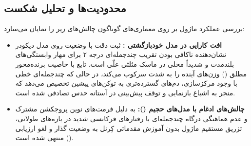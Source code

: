 \subsection{محدودیت‌ها و تحلیل شکست}
بررسی عملکرد ماژول بر روی معماری‌های گوناگون چالش‌های زیر را نمایان می‌سازد:
\begin{itemize}
    \item \textbf{افت کارایی در مدل خودبازگشتی :} ثبت دقت  با وضعیت  روی مدل دیکودر  نشان‌دهنده ناکافی بودن تقریب چندجمله‌ای درجه ۲ برای مهار وابستگی‌های بلندمدت و شدیداً محلی در ماسک مثلثی علّی است. تابع  با خاصیت برنده‌محور مطلق () وزن‌های آینده را به شدت سرکوب می‌کند، در حالی که چندجمله‌ای خطی با وجود مرکزسازی، دم‌های گسترده‌تری به توکن‌های پیشین تخصیص می‌دهد که منجر به اشباع بازنمایی و توقف پیش‌بینی در آستانه حدس تصادفی شده است.
    \item \textbf{چالش‌های ادغام با مدل‌های حجیم ():} به دلیل فرمت‌های نوین پروجکشن مشترک و عدم هماهنگی درگاه چندجمله‌ای با رفتارهای فرکانسی شدید  در بازه‌های طولانی، تزریق مستقیم ماژول بدون آموزش مقدماتی کِرنل به وضعیت گذار و لغو ارزیابی () منتهی شده است.
\end{itemize}

